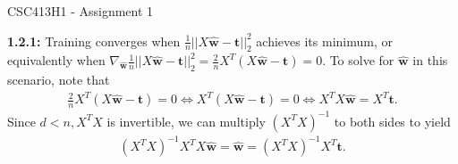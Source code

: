 \documentclass[12pt]{article}
\newcommand{\m}[1]{\mathbf{#1}}
\newcommand{\mhat}[1]{\hat{\mathbf{#1}}}
\begin{document}
\begin{center}
{\Large CSC413H1 - Assignment 1}
\end{center}

\textbf{1.2.1:} Training converges when $\frac{1}{n}||X\mhat w-\m t||^2_2$ achieves its minimum, or equivalently when $\nabla_{\mhat w} \frac{1}{n}||X\mhat w-\m t||^2_2 = \frac{2}{n}X^T(X\mhat w -\m t) = 0$. To solve for $\mhat w$ in this scenario, note that
\begin{align*}
    \frac{2}{n}X^T(X\mhat w -\m t) = 0 \iff X^T(X\mhat w -\m t) = 0 \iff X^T X\mhat w = X^T \m t.
\end{align*}
Since $d < n, X^T X$ is invertible, we can multiply $(X^T X)^{-1}$ to both sides to yield
\begin{align*}
    (X^T X)^{-1} X^T X\mhat w = \mhat w = (X^T X)^{-1} X^T \m t.
\end{align*}
\end{document}
